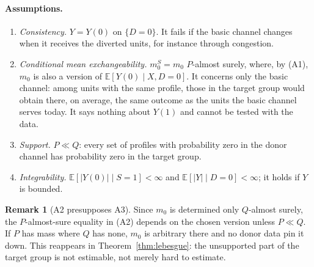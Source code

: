 \documentclass[11pt,a4paper]{article}
\newcommand{\E}{\mathbb{E}}
\theoremstyle{plain}
\theoremstyle{definition}
\newtheorem{remark}{Remark}
\begin{document}
\paragraph{Assumptions.}
\begin{enumerate}[label=(A\arabic*)]
  \item \emph{Consistency.} $Y=Y(0)$ on $\{D=0\}$. It fails if the basic channel changes when it receives the diverted units, for instance through congestion.
  \item \emph{Conditional mean exchangeability.} $m_0^S=m_0$ $P$-almost surely, where, by (A1), $m_0$ is also a version of $\E[Y(0)\mid X,D=0]$. It concerns only the basic channel: among units with the same profile, those in the target group would obtain there, on average, the same outcome as the units the basic channel serves today. It says nothing about $Y(1)$ and cannot be tested with the data.
  \item \emph{Support.} $P\ll Q$: every set of profiles with probability zero in the donor channel has probability zero in the target group.
  \item \emph{Integrability.} $\E[|Y(0)|\mid S=1]<\infty$ and $\E[|Y|\mid D=0]<\infty$; it holds if $Y$ is bounded.
\end{enumerate}

\begin{remark}[A2 presupposes A3]\label{rem:a2a3}
Since $m_0$ is determined only $Q$-almost surely, the $P$-almost-sure equality in (A2) depends on the chosen version unless $P\ll Q$. If $P$ has mass where $Q$ has none, $m_0$ is arbitrary there and no donor data pin it down. This reappears in Theorem~\ref{thm:lebesgue}: the unsupported part of the target group is not estimable, not merely hard to estimate.
\end{remark}
\end{document}
